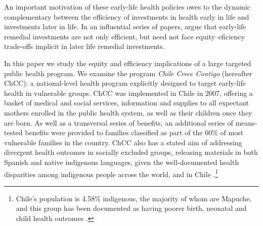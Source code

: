 \documentclass[12pt]{article}
\begin{document}
\begin{spacing}{1.4}
An important motivation of these early-life health policies owes
to the dynamic complementary between the efficiency of investments in health
early in life and investments later in life.  In an influential series of
papers, \citet{HeckmanCunha2007,CunhaHeckman2009,Cunhaetal2010} argue that
early-life remedial investments are not only efficient, but need not face
equity--eficiency trade-offs implicit in later life remedial investments.

In this paper we study the equity and efficiency implications of a large
targeted public health program.  We examine the program \emph{Chile Crece
  Contigo} (hereafter ChCC): a national-level health program 
explicitly designed to target early-life health in vulnerable groups.
ChCC was implemented in Chile in 2007, offering a basket of medical
and social services, information and supplies to all expectant mothers
enrolled in the public health system, as well as their children once they
are born.  As well
as a transversal series of benefits, an additional series of means-tested
benefits were provided to families classified as part of the 60\% of most
vulnerable families in the country.  ChCC also has a stated
aim of addressing divergent health outcomes in socially excluded groups,
releasing materials in both Spanish and native indigenous languages, given
the well-documented health disparities among indigenous people across the
world, and in Chile \citep{Andersonetal2016}.\footnote{Chile's population
  is 4.58\% indigenous, the majority of whom are Mapuche, and this group
  has been documented as having poorer birth, neonatal and child health
  outcomes \citep{Andersonetal2016}.}%


\end{spacing}
\end{document}
